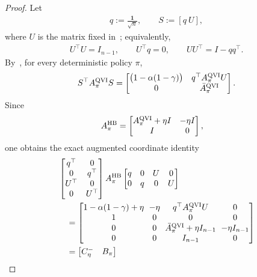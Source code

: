 \documentclass[letterpaper]{article}
\numberwithin{equation}{section}
\begin{document}
\begin{proof}
Let
\begin{align*}
  q:=\frac{\mathbf{1}}{\sqrt{n}},
  \qquad
  S:=[q\ U],
\end{align*}
where $U$ is the matrix fixed in~; equivalently,
\begin{align*}
  U^\top U=I_{n-1},
  \qquad
  U^\top q=0,
  \qquad
  UU^\top=I-qq^\top.
\end{align*}
By~, for every deterministic
policy $\pi$,
\begin{align*}
  S^\top A_\pi^{\rm QVI}S
  =
  \begin{bmatrix}
    \bigl(1-\alpha(1-\gamma)\bigr)&q^\top A_\pi^{\rm QVI}U\\
    0&\bar A_\pi^{\rm QVI}
  \end{bmatrix}.
\end{align*}
Since
\begin{align*}
  A_\pi^{\rm HB}
  &=
  \begin{bmatrix}
    A_\pi^{\rm QVI}+\eta I&-\eta I\\
    I&0
  \end{bmatrix},
\end{align*}
one obtains the exact augmented coordinate identity
\begin{equation*}
\begin{aligned}
&\begin{bmatrix}
    q^\top&0\\
    0&q^\top\\
    U^\top&0\\
    0&U^\top
  \end{bmatrix}
  A_\pi^{\rm HB}
  \begin{bmatrix}
    q&0&U&0\\
    0&q&0&U
  \end{bmatrix}\\
  &\quad=
  {\setlength{\arraycolsep}{3pt}
  \begin{bmatrix}
    1-\alpha(1-\gamma)+\eta&-\eta&q^\top A_\pi^{\rm QVI}U&0\\
    1&0&0&0\\
    0&0&\bar A_\pi^{\rm QVI}+\eta I_{n-1}
      &-\eta I_{n-1}\\
    0&0&I_{n-1}&0
  \end{bmatrix}}\\
  &\quad=
  \begin{bmatrix}
    C_\eta^-&B_\pi\\

\end{bmatrix}
\end{aligned}
\end{equation*}
\end{proof}
\end{document}
